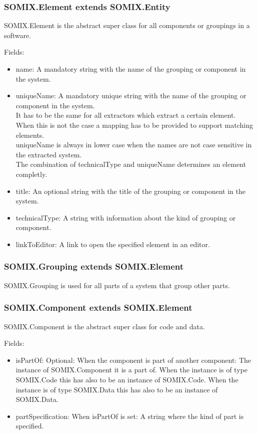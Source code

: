 \documentclass[preprint,12pt]{elsarticle}
\begin{document}
\subsubsection{SOMIX.Element extends SOMIX.Entity}

SOMIX.Element is the abstract super class for all components or groupings in a software.

Fields:
\begin{itemize}
\item name: A mandatory string with the name of the grouping or component in the system.
\item uniqueName: A mandatory unique string with the name of the grouping or component in the system.\\
It has to be the same for all extractors which extract a certain element. When this is not the case a mapping has to be provided to support matching elements.\\
uniqueName is always in lower case when the names are not case sensitive in the extracted system.\\
The combination of technicalType and uniqueName determines an element completly.
\item title: An optional string with the title of the grouping or component in the system.
\item technicalType: A string with information about the kind of grouping or component.
\item linkToEditor: A link to open the specified element in an editor.
\end{itemize}



\subsubsection{SOMIX.Grouping extends SOMIX.Element}

SOMIX.Grouping is used for all parts of a system that group other parts.

\subsubsection{SOMIX.Component extends SOMIX.Element}

SOMIX.Component is the abstract super class for code and data.

Fields:
\begin{itemize}
\item isPartOf: Optional: When the component is part of another component: The instance of SOMIX.Component it is a part of. When the instance is of type SOMIX.Code this has also to be an instance of SOMIX.Code. When the instance is of type SOMIX.Data this has also to be an instance of SOMIX.Data.
\item partSpecification: When isPartOf is set: A string where the kind of part is specified.
\end{itemize}
\end{document}
